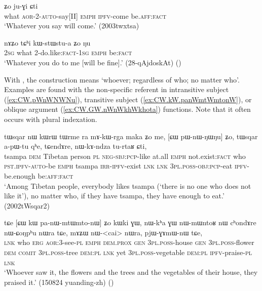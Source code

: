 \begin{exe}
\ex \label{ex:tChi.tAtWnWtWtWt}
 ʑo ju-ɣi ɕti \\
what \textsc{aor}-2-\textsc{auto}-say[II] \textsc{emph} \textsc{ipfv}-come be.\textsc{aff}:\textsc{fact} \\
\glt  `Whatever you say will come.' (2003twxtsa)
\end{exe}  

\begin{exe}
\ex \label{ex:tChi.kWstWstua}
\gll nɤʑo tɕʰi kɯ-stɯ\redp{}stu-a ʑo ŋu \\
\textsc{2sg} what 2-do.like:\textsc{fact}-\textsc{1sg} \textsc{emph} be:\textsc{fact} \\
\glt `Whatever you do to me [will be fine].' (28-qAjdoskAt) ()
\end{exe}


With , the construction means `whoever; regardless of who; no matter who'. Examples are found with the non-specific referent in intransitive subject (\ref{ex:CW.pWnWNWNu}), transitive subject (\ref{ex:CW.kW.panWmtWmtonW}), or oblique argument (\ref{ex:CW.GW.nWnWkhWkhota}) functions. Note that it often occurs with plural indexation.

\begin{exe}
\ex \label{ex:CW.pWnWNWNu}
\gll tɯsqar nɯ kɯrɯ tɯrme ra mɤ-kɯ-rga maka ʑo me, [ɕɯ pɯ-nɯ-ŋɯ\redp{}ŋu] ʑo, tɯsqar a-pɯ-tu qʰe, tɕendɤre, nɯ-kɤ-ndza tu-rtaʁ ɕti, \\
tsampa \textsc{dem} Tibetan person \textsc{pl} \textsc{neg}-\textsc{sbj}:\textsc{pcp}-like at.all \textsc{emph} not.exist:\textsc{fact} who  \textsc{pst}.\textsc{ipfv}-\textsc{auto}-be \textsc{emph} tsampa \textsc{irr}-\textsc{ipfv}-exist \textsc{lnk} \textsc{lnk} \textsc{3pl}.\textsc{poss}-\textsc{obj}:\textsc{pcp}-eat \textsc{ipfv}-be.enough be:\textsc{aff}:\textsc{fact} \\
\glt `Among Tibetan people, everybody likes tsampa (`there is no one who does not like it'), no matter who, if they have tsampa, they have enough to eat.' (2002tWsqar2)
\end{exe}

\begin{exe}
\ex \label{ex:CW.kW.panWmtWmtonW}
\gll tɕe [ɕɯ kɯ pa-nɯ-mtɯ\redp{}mto-nɯ] ʑo kɯki ɣɯ, nɯ-kʰa ɣɯ nɯ-mɯntoʁ nɯ cʰondɤre nɯ-ɕoŋpʰu nɯra tɕe, mɤʑɯ nɯ-<cai> nɯra, pjɯ-ɣɤmɯ-nɯ tɕe, \\
\textsc{lnk} who \textsc{erg} \textsc{aor}:3\flobv{}-see-\textsc{pl} \textsc{emph} \textsc{dem}.\textsc{prox} \textsc{gen} \textsc{3pl}.\textsc{poss}-house \textsc{gen} \textsc{3pl}.\textsc{poss}-flower \textsc{dem} \textsc{comit} \textsc{3pl}.\textsc{poss}-tree \textsc{dem}:\textsc{pl} \textsc{lnk} yet \textsc{3pl}.\textsc{poss}-vegetable \textsc{dem}:\textsc{pl} \textsc{ipfv}-praise-\textsc{pl} \textsc{lnk} \\
\glt `Whoever saw it, the flowers and the trees and the vegetables of their house, they praised it.' (150824 yuanding-zh) ()
\end{exe}


